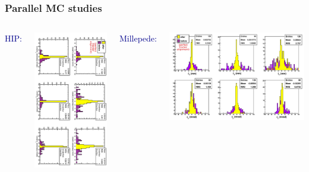 \documentclass[compress]{beamer}
\begin{document}
\begin{frame}
\frametitle{Parallel MC studies}

\begin{columns}

\textcolor{darkblue}{HIP:}

\includegraphics[height=\linewidth, angle=90]{hip_MC.pdf}

\vfill
\textcolor{darkblue}{Millepede:}

\includegraphics[width=\linewidth]{Millipede_MC_RandomScenario.pdf}


\end{columns}
\end{frame}
\end{document}
